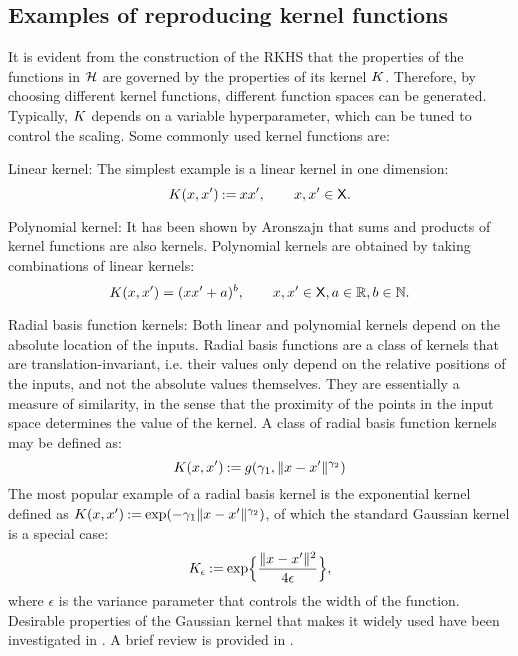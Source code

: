 
\subsection{Examples of reproducing kernel functions}
It is evident from the construction of the RKHS that the properties of the functions in ${\cal H}$ are governed by the properties of its kernel $K$. Therefore, by choosing different kernel functions, different function spaces can be generated. Typically, $K$ depends on a variable hyperparameter, which can be tuned to control the scaling. Some commonly used kernel functions are:
\begin{arabnum}
\item Linear kernel: The simplest example is a linear kernel in one dimension:
\begin{equation}
K(x,x') \mathbin{:=} x x', \qquad x,x' \in {\sf X}.
\end{equation}
\item Polynomial kernel: It has been shown by Aronszajn \cite{aro50} that sums and products of kernel functions are also kernels. Polynomial kernels are obtained by taking combinations of linear kernels:
\begin{equation}
K(x,x') = (xx' + a)^b, \qquad x,x'\in {\sf X}, a \in \mathbb{R}, b \in \mathbb{N}.
\end{equation}
\item Radial basis function kernels: Both linear and polynomial kernels depend on the absolute location of the inputs. Radial basis functions are a class of kernels that are translation-invariant, i.e. their values only depend on the relative positions of the inputs, and not the absolute values themselves. They are essentially a measure of similarity, in the sense that the proximity of the points in the input space determines the value of the kernel. A class of radial basis function kernels may be defined as:
\begin{equation}
K(x,x') \mathbin{:=} g(\gamma_1, \|x-x'\|^{\gamma_2})
\end{equation}  
The most popular example of a radial basis kernel is the exponential kernel defined as $K(x,x') \mathbin{:=} \exp(-\gamma_1 \|x - x'\|^{\gamma_2})$, of which the standard Gaussian kernel is a special case:
\[
K_\epsilon \mathbin{:=} \exp\Bigl\{\frac{\|x-x'\|^2}{4 \epsilon}\Bigr\},
\]
where $\epsilon$ is the variance parameter that controls the width of the function. Desirable properties of the Gaussian kernel that makes it widely used have been investigated in \cite{min10,stehussco06}. A brief review is provided in . 
\end{arabnum}


